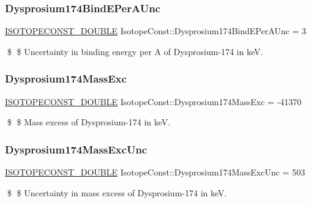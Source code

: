 \subsubsection{\texorpdfstring{Dysprosium174\+Bind\+E\+Per\+A\+Unc}{Dysprosium174BindEPerAUnc}}
{\footnotesize\ttfamily \mbox{\hyperlink{group___isotope_const-_macros_ga8f45a7272ce02c0b4c65c44636ed719a}{I\+S\+O\+T\+O\+P\+E\+C\+O\+N\+S\+T\+\_\+\+D\+O\+U\+B\+LE}} Isotope\+Const\+::\+Dysprosium174\+Bind\+E\+Per\+A\+Unc = 3}

\$ \$ Uncertainty in binding energy per A of Dysprosium-\/174 in keV. \mbox{\label{group___isotope_const-_dysprosium-_dy174_ga49018e8ebef106dfbc7fca0ec4bef9c2}} 
\subsubsection{\texorpdfstring{Dysprosium174\+Mass\+Exc}{Dysprosium174MassExc}}
{\footnotesize\ttfamily \mbox{\hyperlink{group___isotope_const-_macros_ga8f45a7272ce02c0b4c65c44636ed719a}{I\+S\+O\+T\+O\+P\+E\+C\+O\+N\+S\+T\+\_\+\+D\+O\+U\+B\+LE}} Isotope\+Const\+::\+Dysprosium174\+Mass\+Exc = -\/41370}

\$ \$ Mass excess of Dysprosium-\/174 in keV. \mbox{\label{group___isotope_const-_dysprosium-_dy174_ga89cddf0f4cfb88bba2164a9169edb89b}} 
\subsubsection{\texorpdfstring{Dysprosium174\+Mass\+Exc\+Unc}{Dysprosium174MassExcUnc}}
{\footnotesize\ttfamily \mbox{\hyperlink{group___isotope_const-_macros_ga8f45a7272ce02c0b4c65c44636ed719a}{I\+S\+O\+T\+O\+P\+E\+C\+O\+N\+S\+T\+\_\+\+D\+O\+U\+B\+LE}} Isotope\+Const\+::\+Dysprosium174\+Mass\+Exc\+Unc = 503}

\$ \$ Uncertainty in mass excess of Dysprosium-\/174 in keV. \mbox{\label{group___isotope_const-_dysprosium-_dy174_ga12a9a590de21d37cf4b26fb9b938f814}} 
